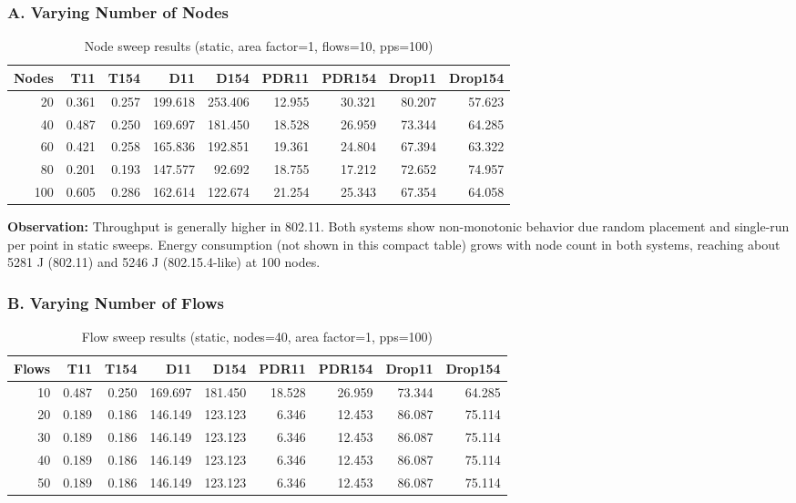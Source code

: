 \documentclass[12pt,a4paper]{article}
\begin{document}
\subsubsection*{A. Varying Number of Nodes}
\begin{table}[H]
\centering
\scriptsize
\caption{Node sweep results (static, area factor=1, flows=10, pps=100)}
\begin{tabular}{rrrrrrrrr}
\toprule
Nodes & T11 & T154 & D11 & D154 & PDR11 & PDR154 & Drop11 & Drop154 \\
\midrule
20  & 0.361 & 0.257 & 199.618 & 253.406 & 12.955 & 30.321 & 80.207 & 57.623 \\
40  & 0.487 & 0.250 & 169.697 & 181.450 & 18.528 & 26.959 & 73.344 & 64.285 \\
60  & 0.421 & 0.258 & 165.836 & 192.851 & 19.361 & 24.804 & 67.394 & 63.322 \\
80  & 0.201 & 0.193 & 147.577 & 92.692  & 18.755 & 17.212 & 72.652 & 74.957 \\
100 & 0.605 & 0.286 & 162.614 & 122.674 & 21.254 & 25.343 & 67.354 & 64.058 \\
\bottomrule
\end{tabular}
\end{table}

\textbf{Observation:}
Throughput is generally higher in 802.11. Both systems show non-monotonic behavior due random placement and single-run per point in static sweeps. Energy consumption (not shown in this compact table) grows with node count in both systems, reaching about 5281 J (802.11) and 5246 J (802.15.4-like) at 100 nodes.

\subsubsection*{B. Varying Number of Flows}
\begin{table}[H]
\centering
\scriptsize
\caption{Flow sweep results (static, nodes=40, area factor=1, pps=100)}
\begin{tabular}{rrrrrrrrr}
\toprule
Flows & T11 & T154 & D11 & D154 & PDR11 & PDR154 & Drop11 & Drop154 \\
\midrule
10 & 0.487 & 0.250 & 169.697 & 181.450 & 18.528 & 26.959 & 73.344 & 64.285 \\
20 & 0.189 & 0.186 & 146.149 & 123.123 & 6.346  & 12.453 & 86.087 & 75.114 \\
30 & 0.189 & 0.186 & 146.149 & 123.123 & 6.346  & 12.453 & 86.087 & 75.114 \\
40 & 0.189 & 0.186 & 146.149 & 123.123 & 6.346  & 12.453 & 86.087 & 75.114 \\
50 & 0.189 & 0.186 & 146.149 & 123.123 & 6.346  & 12.453 & 86.087 & 75.114 \\
\bottomrule
\end{tabular}
\end{table}
\end{document}
